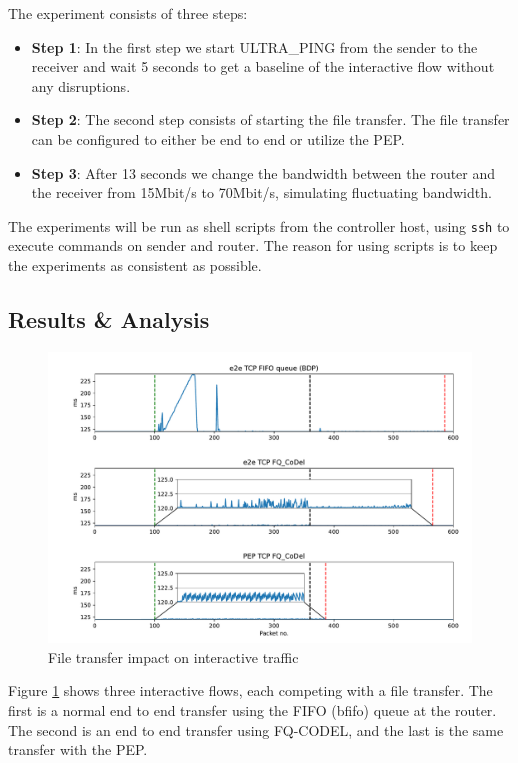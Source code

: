 \documentclass[a4paper,english, 11pt]{report}
\begin{document}
The experiment consists of three steps:

\begin{itemize}
  \item \textbf{Step 1}: In the first step we start ULTRA\_PING from the sender to the receiver and wait 5 seconds to get a baseline of the interactive flow without any disruptions.
  \item \textbf{Step 2}: The second step consists of starting the file transfer. The file transfer can be configured to either be end to end or utilize the PEP.
  \item \textbf{Step 3}: After 13 seconds we change the bandwidth between the router and the receiver from 15Mbit/s to 70Mbit/s, simulating fluctuating bandwidth.
\end{itemize}

The experiments will be run as shell scripts from the controller host, using \verb|ssh| to execute commands on sender and router. The reason for using scripts is to keep the experiments as consistent as possible.

\subsection{Results \& Analysis}

\begin{figure}[h!] %
	\centering
	\includegraphics[scale=0.45]{../diagrams/graphs/final2.pdf}
  	\caption{File transfer impact on interactive traffic}
  	\label{fig:graph1}
\end{figure}

Figure \ref{fig:graph1} shows three interactive flows, each competing with a file transfer. The first is a normal end to end transfer using the FIFO (bfifo) queue at the router. The second is an end to end transfer using FQ-CODEL, and the last is the same transfer with the PEP.\\
\end{document}
